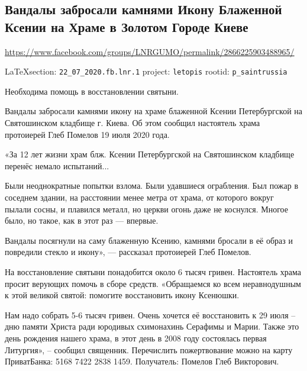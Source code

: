  
 

\subsection{Вандалы забросали камнями Икону Блаженной Ксении на Храме в Золотом Городе Киеве}
\url{https://www.facebook.com/groups/LNRGUMO/permalink/2866225903488965/}

\vspace{0.5cm}
{\small\LaTeX section: \verb|22_07_2020.fb.lnr.1| project: \verb|letopis| rootid: \verb|p_saintrussia|}
\vspace{0.5cm}

Необходима помощь в восстановлении святыни.

Вандалы забросали камнями икону на храме блаженной Ксении Петербургской на
Святошинском кладбище г. Киева.  Об этом сообщил настоятель храма протоиерей
Глеб Помелов 19 июля 2020 года.

«За 12 лет жизни храм блж. Ксении Петербургской на Святошинском кладбище
перенёс немало испытаний...

Были неоднократные попытки взлома.  Были удавшиеся ограбления. Был пожар в
соседнем здании, на расстоянии менее метра от храма, от которого вокруг пылали
сосны, и плавился металл, но церкви огонь даже не коснулся.  Многое было, но
такое, как в этот раз --- впервые.

Вандалы посягнули на саму блаженную Ксению, камнями бросали в её образ и
повредили стекло и икону», --- рассказал протоиерей Глеб Помелов.

На восстановление святыни понадобится около 6 тысяч гривен. Настоятель храма
просит верующих помочь в сборе средств.  «Обращаемся ко всем неравнодушным к
этой великой святой: помогите восстановить икону Ксенюшки.

Нам надо собрать 5-6 тысяч гривен. Очень хочется её восстановить к 29 июля –
дню памяти Христа ради юродивых схимонахинь Серафимы и Марии.  Также это день
рождения нашего храма, в этот день в 2008 году состоялась первая Литургия», –
сообщил священник.  Перечислить пожертвование можно на карту ПриватБанка: 5168
7422 2838 1459.  Получатель: Помелов Глеб Викторович.
  
